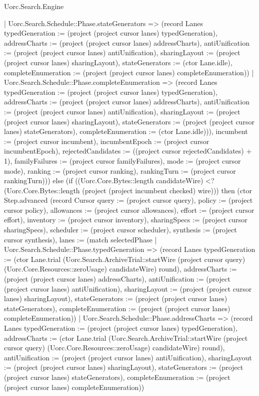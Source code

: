 \begin{lexlean}{Uorc.Search.Engine}
\begin{semanticmodule}
{{      | Uorc.Search.Schedule::Phase.stateGenerators => (record Lanes {typedGeneration := (project (project cursor lanes) typedGeneration), addressCharts := (project (project cursor lanes) addressCharts), antiUnification := (project (project cursor lanes) antiUnification), sharingLayout := (project (project cursor lanes) sharingLayout), stateGenerators := (ctor Lane.idle), completeEnumeration := (project (project cursor lanes) completeEnumeration)})
      | Uorc.Search.Schedule::Phase.completeEnumeration => (record Lanes {typedGeneration := (project (project cursor lanes) typedGeneration), addressCharts := (project (project cursor lanes) addressCharts), antiUnification := (project (project cursor lanes) antiUnification), sharingLayout := (project (project cursor lanes) sharingLayout), stateGenerators := (project (project cursor lanes) stateGenerators), completeEnumeration := (ctor Lane.idle)})), incumbent := (project cursor incumbent), incumbentEpoch := (project cursor incumbentEpoch), rejectedCandidates := ((project cursor rejectedCandidates) + 1), familyFailures := (project cursor familyFailures), mode := (project cursor mode), ranking := (project cursor ranking), rankingTurn := (project cursor rankingTurn)})) else (if ((Uorc.Core.Bytes::length candidateWire) <? (Uorc.Core.Bytes::length (project (project incumbent checked) wire))) then (ctor Step.advanced (record Cursor {query := (project cursor query), policy := (project cursor policy), allowances := (project cursor allowances), effort := (project cursor effort), inventory := (project cursor inventory), sharingSpecs := (project cursor sharingSpecs), scheduler := (project cursor scheduler), synthesis := (project cursor synthesis), lanes := (match selectedPhase
      | Uorc.Search.Schedule::Phase.typedGeneration => (record Lanes {typedGeneration := (ctor Lane.trial (Uorc.Search.ArchiveTrial::startWire (project cursor query) (Uorc.Core.Resources::zeroUsage) candidateWire) round), addressCharts := (project (project cursor lanes) addressCharts), antiUnification := (project (project cursor lanes) antiUnification), sharingLayout := (project (project cursor lanes) sharingLayout), stateGenerators := (project (project cursor lanes) stateGenerators), completeEnumeration := (project (project cursor lanes) completeEnumeration)})
      | Uorc.Search.Schedule::Phase.addressCharts => (record Lanes {typedGeneration := (project (project cursor lanes) typedGeneration), addressCharts := (ctor Lane.trial (Uorc.Search.ArchiveTrial::startWire (project cursor query) (Uorc.Core.Resources::zeroUsage) candidateWire) round), antiUnification := (project (project cursor lanes) antiUnification), sharingLayout := (project (project cursor lanes) sharingLayout), stateGenerators := (project (project cursor lanes) stateGenerators), completeEnumeration := (project (project cursor lanes) completeEnumeration)})
}}
\end{semanticmodule}
\end{lexlean}
